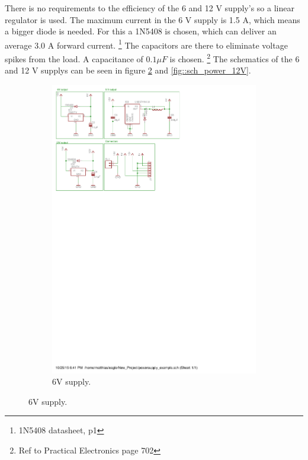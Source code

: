 There is no requirements to the efficiency of the 6 and 12 V supply's so a linear regulator is used.
The maximum current in the 6 V supply is 1.5 A, which means a bigger diode is needed.
For this a 1N5408 is chosen, which can deliver an average 3.0 A forward current.
\footnote{1N5408 datasheet, p1}
The capacitors are there to eliminate voltage spikes from the load. A capacitance of $0.1 \mu F$ is chosen.
\footnote{Ref to Practical Electronics page 702}
The schematics of the 6 and 12 V supplys can be seen in figure \ref{fig::sch_power_6V} and \ref{fig::sch_power_12V}.

\begin{figure}[H] %
\centering
\begin{subfigure}{0.3\linewidth}
\centering
\includegraphics[scale=0.8,trim={0 24cm 15.7cm 0.6cm},clip]{img/powersupply.pdf}
\caption{6V supply.}
\label{fig::sch_power_6V}

\end{subfigure}
\end{figure}
